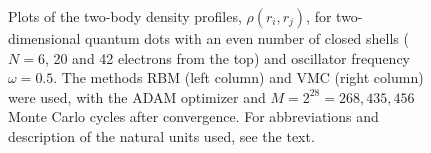\begin{figure}[H]
	\hspace{0.1cm}
	
	\caption{Plots of the two-body density profiles, $\rho(r_i, r_j)$, for two-dimensional quantum dots with an even number of closed shells ($N=6$, 20 and 42 electrons from the top) and oscillator frequency $\omega=0.5$. The methods RBM (left column) and VMC (right column) were used, with the ADAM optimizer and $M=2^{28}=268,435,456$ Monte Carlo cycles after convergence. For  abbreviations and description of the natural units used, see the text.}%
	\label{fig:TB_interaction_20P}
\end{figure}

